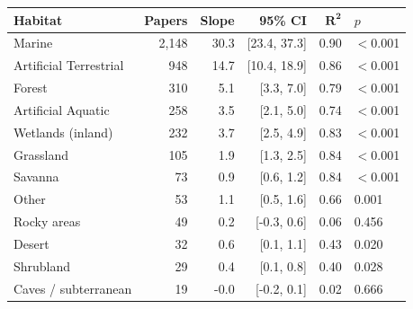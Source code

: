 \begin{tabular}{lrrrrl}
\toprule
\textbf{Habitat} & \textbf{Papers} & \textbf{Slope} & \textbf{95\% CI} & $\mathbf{R^2}$ & \textbf{$p$} \\
\midrule
Marine & 2,148 & 30.3 & [23.4, 37.3] & 0.90 & $<$0.001 \\
Artificial Terrestrial & 948 & 14.7 & [10.4, 18.9] & 0.86 & $<$0.001 \\
Forest & 310 & 5.1 & [3.3, 7.0] & 0.79 & $<$0.001 \\
Artificial Aquatic & 258 & 3.5 & [2.1, 5.0] & 0.74 & $<$0.001 \\
Wetlands (inland) & 232 & 3.7 & [2.5, 4.9] & 0.83 & $<$0.001 \\
Grassland & 105 & 1.9 & [1.3, 2.5] & 0.84 & $<$0.001 \\
Savanna & 73 & 0.9 & [0.6, 1.2] & 0.84 & $<$0.001 \\
Other & 53 & 1.1 & [0.5, 1.6] & 0.66 & 0.001 \\
Rocky areas & 49 & 0.2 & [-0.3, 0.6] & 0.06 & 0.456 \\
Desert & 32 & 0.6 & [0.1, 1.1] & 0.43 & 0.020 \\
Shrubland & 29 & 0.4 & [0.1, 0.8] & 0.40 & 0.028 \\
Caves / subterranean & 19 & -0.0 & [-0.2, 0.1] & 0.02 & 0.666 \\
\bottomrule
\end{tabular}
